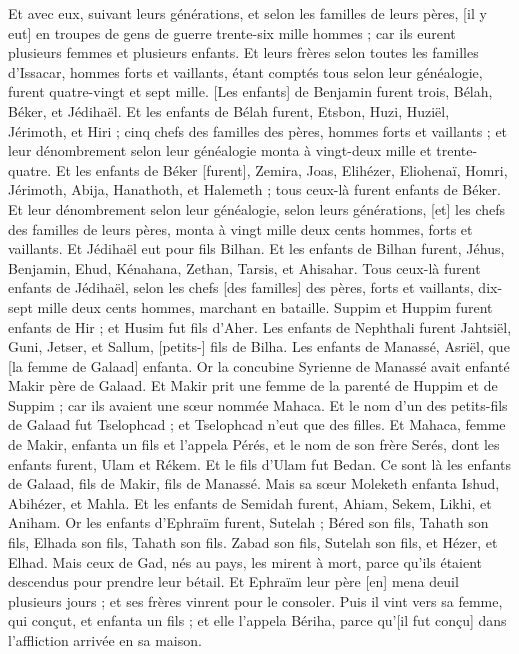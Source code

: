 \begin{multicols}{2}
Et avec eux, suivant leurs générations, et selon les familles de leurs pères, [il y eut] en troupes de gens de guerre trente-six mille hommes ; car ils eurent plusieurs femmes et plusieurs enfants.
Et leurs frères selon toutes les familles d'Issacar, hommes forts et vaillants, étant comptés tous selon leur généalogie, furent quatre-vingt et sept mille.
[Les enfants] de Benjamin furent trois, Bélah, Béker, et Jédihaël.
Et les enfants de Bélah furent, Etsbon, Huzi, Huziël, Jérimoth, et Hiri ; cinq chefs des familles des pères, hommes forts et vaillants ; et leur dénombrement selon leur généalogie monta à vingt-deux mille et trente-quatre.
Et les enfants de Béker [furent], Zemira, Joas, Elihézer, Eliohenaï, Homri, Jérimoth, Abija, Hanathoth, et Halemeth ; tous ceux-là furent enfants de Béker.
Et leur dénombrement selon leur généalogie, selon leurs générations, [et] les chefs des familles de leurs pères, monta à vingt mille deux cents hommes, forts et vaillants.
Et Jédihaël eut pour fils Bilhan. Et les enfants de Bilhan furent, Jéhus, Benjamin, Ehud, Kénahana, Zethan, Tarsis, et Ahisahar.
Tous ceux-là furent enfants de Jédihaël, selon les chefs [des familles] des pères, forts et vaillants, dix-sept mille deux cents hommes, marchant en bataille.
Suppim et Huppim furent enfants de Hir ; et Husim fut fils d'Aher.
Les enfants de Nephthali furent Jahtsiël, Guni, Jetser, et Sallum, [petits-] fils de Bilha.
Les enfants de Manassé, Asriël, que [la femme de Galaad] enfanta. Or la concubine Syrienne de Manassé avait enfanté Makir père de Galaad.
Et Makir prit une femme de la parenté de Huppim et de Suppim ; car ils avaient une sœur nommée Mahaca. Et le nom d'un des petits-fils de Galaad fut Tselophcad ; et Tselophcad n'eut que des filles.
Et Mahaca, femme de Makir, enfanta un fils et l'appela Pérés, et le nom de son frère Serés, dont les enfants furent, Ulam et Rékem.
Et le fils d'Ulam fut Bedan. Ce sont là les enfants de Galaad, fils de Makir, fils de Manassé.
Mais sa sœur Moleketh enfanta Ishud, Abihézer, et Mahla.
Et les enfants de Semidah furent, Ahiam, Sekem, Likhi, et Aniham.
Or les enfants d'Ephraïm furent, Sutelah ; Béred son fils, Tahath son fils, Elhada son fils, Tahath son fils.
Zabad son fils, Sutelah son fils, et Hézer, et Elhad. Mais ceux de Gad, nés au pays, les mirent à mort, parce qu'ils étaient descendus pour prendre leur bétail.
Et Ephraïm leur père [en] mena deuil plusieurs jours ; et ses frères vinrent pour le consoler.
Puis il vint vers sa femme, qui conçut, et enfanta un fils ; et elle l'appela Bériha, parce qu'[il fut conçu] dans l'affliction arrivée en sa maison.

\end{multicols}
